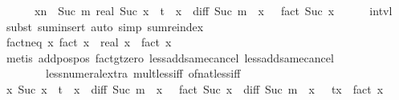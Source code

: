 \begin{isabellebody}
\ \ \ \ \ \ {\isacharparenleft}{\kern0pt}{\isasymSum}x{\isacharless}{\kern0pt}n\ {\isacharminus}{\kern0pt}\ Suc\ m{\isachardot}{\kern0pt}\ real\ {\isacharparenleft}{\kern0pt}Suc\ x{\isacharparenright}{\kern0pt}\ {\isacharasterisk}{\kern0pt}\ t\ {\isacharcircum}{\kern0pt}\ x\ {\isacharasterisk}{\kern0pt}\ diff\ {\isacharparenleft}{\kern0pt}Suc\ m\ {\isacharplus}{\kern0pt}\ x{\isacharparenright}{\kern0pt}\ {}\ {\isacharslash}{\kern0pt}\ fact\ {\isacharparenleft}{\kern0pt}Suc\ x{\isacharparenright}{\kern0pt}{\isacharparenright}{\kern0pt}{\isachardoublequoteclose}\isanewline
\ \ \ \ \isamarkupfalse%
\ intvl\ \isamarkupfalse%
\ {\isacharparenleft}{\kern0pt}subst\ sum{\isachardot}{\kern0pt}insert{\isacharparenright}{\kern0pt}\ {\isacharparenleft}{\kern0pt}auto\ simp{\isacharcolon}{\kern0pt}\ sum{\isachardot}{\kern0pt}reindex{\isacharparenright}{\kern0pt}\isanewline
\ \ \isamarkupfalse%
\isanewline
\ \ \isamarkupfalse%
\ fact{\isacharunderscore}{\kern0pt}neq{\isacharunderscore}{\kern0pt}{}{\isacharcolon}{\kern0pt}\ {\isachardoublequoteopen}{\isasymAnd}x{\isachardot}{\kern0pt}\ {\isacharparenleft}{\kern0pt}fact\ x{\isacharparenright}{\kern0pt}\ {\isacharplus}{\kern0pt}\ real\ x\ {\isacharasterisk}{\kern0pt}\ {\isacharparenleft}{\kern0pt}fact\ x{\isacharparenright}{\kern0pt}\ {\isasymnoteq}\ {}{\isachardoublequoteclose}\isanewline
\ \ \ \ \isamarkupfalse%
\ {\isacharparenleft}{\kern0pt}metis\ add{\isacharunderscore}{\kern0pt}pos{\isacharunderscore}{\kern0pt}pos\ fact{\isacharunderscore}{\kern0pt}gt{\isacharunderscore}{\kern0pt}zero\ less{\isacharunderscore}{\kern0pt}add{\isacharunderscore}{\kern0pt}same{\isacharunderscore}{\kern0pt}cancel{}\ less{\isacharunderscore}{\kern0pt}add{\isacharunderscore}{\kern0pt}same{\isacharunderscore}{\kern0pt}cancel{}\isanewline
\ \ \ \ \ \ \ \ less{\isacharunderscore}{\kern0pt}numeral{\isacharunderscore}{\kern0pt}extra{\isacharparenleft}{\kern0pt}{}{\isacharparenright}{\kern0pt}\ mult{\isacharunderscore}{\kern0pt}less{\isacharunderscore}{\kern0pt}{}{\isacharunderscore}{\kern0pt}iff\ of{\isacharunderscore}{\kern0pt}nat{\isacharunderscore}{\kern0pt}less{\isacharunderscore}{\kern0pt}{}{\isacharunderscore}{\kern0pt}iff{\isacharparenright}{\kern0pt}\isanewline
\ \ \isamarkupfalse%
\ {\isachardoublequoteopen}{\isasymAnd}x{\isachardot}{\kern0pt}\ {\isacharparenleft}{\kern0pt}Suc\ x{\isacharparenright}{\kern0pt}\ {\isacharasterisk}{\kern0pt}\ t\ {\isacharcircum}{\kern0pt}\ x\ {\isacharasterisk}{\kern0pt}\ diff\ {\isacharparenleft}{\kern0pt}Suc\ m\ {\isacharplus}{\kern0pt}\ x{\isacharparenright}{\kern0pt}\ {}\ {\isacharslash}{\kern0pt}\ fact\ {\isacharparenleft}{\kern0pt}Suc\ x{\isacharparenright}{\kern0pt}\ {\isacharequal}{\kern0pt}\ diff\ {\isacharparenleft}{\kern0pt}Suc\ m\ {\isacharplus}{\kern0pt}\ x{\isacharparenright}{\kern0pt}\ {}\ {\isacharasterisk}{\kern0pt}\ t{\isacharcircum}{\kern0pt}x\ {\isacharslash}{\kern0pt}\ fact\ x{\isachardoublequoteclose}\isanewline

\end{isabellebody}
